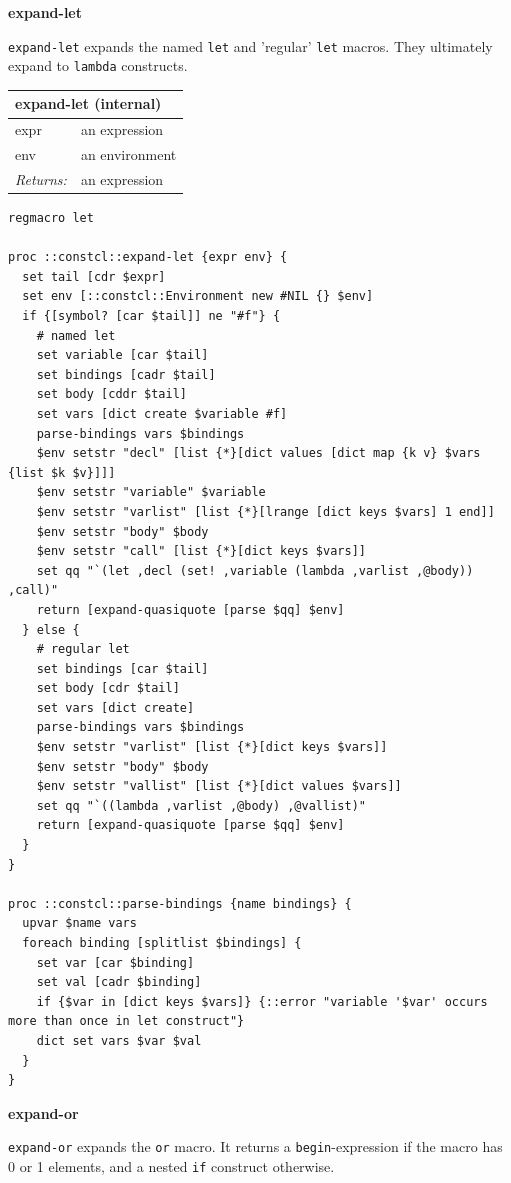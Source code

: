 \documentclass[twoside,9pt]{report}
\begin{document}
\textbf{expand-let}


\texttt{expand-let} expands the named \texttt{let} and 'regular' \texttt{let} macros. They ultimately expand to \texttt{lambda} constructs.

\begin{tabular}{ |l l| }
\hline
\multicolumn{2}{|l|}{expand-let (internal)} \\
\hline
expr & an expression \\
env & an environment \\
\textit{Returns:} & an expression \\
\hline
\end{tabular}

\noindent\makebox[\linewidth]{\rule{\linewidth}{0.4pt}}
\begin{lstlisting}
regmacro let
 
proc ::constcl::expand-let {expr env} {
  set tail [cdr $expr]
  set env [::constcl::Environment new #NIL {} $env]
  if {[symbol? [car $tail]] ne "#f"} {
    # named let
    set variable [car $tail]
    set bindings [cadr $tail]
    set body [cddr $tail]
    set vars [dict create $variable #f]
    parse-bindings vars $bindings
    $env setstr "decl" [list {*}[dict values [dict map {k v} $vars {list $k $v}]]]
    $env setstr "variable" $variable
    $env setstr "varlist" [list {*}[lrange [dict keys $vars] 1 end]]
    $env setstr "body" $body
    $env setstr "call" [list {*}[dict keys $vars]]
    set qq "`(let ,decl (set! ,variable (lambda ,varlist ,@body)) ,call)"
    return [expand-quasiquote [parse $qq] $env]
  } else {
    # regular let
    set bindings [car $tail]
    set body [cdr $tail]
    set vars [dict create]
    parse-bindings vars $bindings
    $env setstr "varlist" [list {*}[dict keys $vars]]
    $env setstr "body" $body
    $env setstr "vallist" [list {*}[dict values $vars]]
    set qq "`((lambda ,varlist ,@body) ,@vallist)"
    return [expand-quasiquote [parse $qq] $env]
  }
}
 
proc ::constcl::parse-bindings {name bindings} {
  upvar $name vars
  foreach binding [splitlist $bindings] {
    set var [car $binding]
    set val [cadr $binding]
    if {$var in [dict keys $vars]} {::error "variable '$var' occurs more than once in let construct"}
    dict set vars $var $val
  }
}
\end{lstlisting}
\noindent\makebox[\linewidth]{\rule{\linewidth}{0.4pt}}

\textbf{expand-or}


\texttt{expand-or} expands the \texttt{or} macro. It returns a \texttt{begin}-expression if the macro has 0 or 1 elements, and a nested \texttt{if} construct otherwise.
\end{document}
